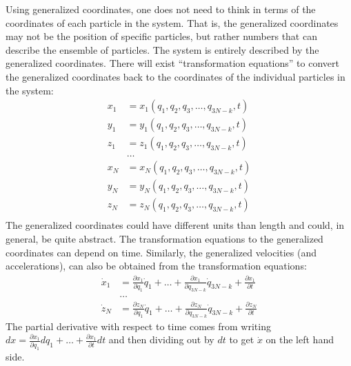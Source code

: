 Using generalized coordinates, one does not need to think in terms of the coordinates of each particle in the system. That is, the generalized coordinates may not be the position of specific particles, but rather numbers that can describe the ensemble of particles. The system is entirely described by the generalized coordinates. There will exist ``transformation equations'' to convert the generalized coordinates back to the coordinates of the individual particles in the system:
\begin{align}
x_1&=x_1(q_1,q_2,q_3,\dots,q_{3N-k},t)\nonumber\\
y_1&=y_1(q_1,q_2,q_3,\dots,q_{3N-k},t)\nonumber\\
z_1&=z_1(q_1,q_2,q_3,\dots,q_{3N-k},t)\nonumber\\
&\dots\nonumber\\
x_N&=x_N(q_1,q_2,q_3,\dots,q_{3N-k},t)\nonumber\\
y_N&=y_N(q_1,q_2,q_3,\dots,q_{3N-k},t)\nonumber\\
z_N&=z_N(q_1,q_2,q_3,\dots,q_{3N-k},t)\nonumber\\
\end{align}
The generalized coordinates could have different units than length and could, in general, be quite abstract. The transformation equations to the generalized coordinates can depend on time.
\noindent
Similarly, the generalized velocities (and accelerations), can also be obtained from the transformation equations:
\begin{align}
\dot{x}_1&=\frac{\partial x_1}{\partial q_1}\dot{q}_1+\dots+\frac{\partial x_1}{\partial q_{3N-k}}\dot{q}_{3N-k}+\frac{\partial x_1}{\partial t}\nonumber\\
&\dots\nonumber\\
\dot{z}_N&=\frac{\partial z_N}{\partial q_1}\dot{q}_1+\dots+\frac{\partial z_N}{\partial q_{3N-k}}\dot{q}_{3N-k}+\frac{\partial z_N}{\partial t}\nonumber
\end{align}
The partial derivative with respect to time comes from writing $dx = \frac{\partial x_1}{\partial q_1}dq_1+\dots +\frac{\partial x_1}{\partial t} dt$ and then dividing out by $dt$ to get $\dot{x}$ on the left hand side.
